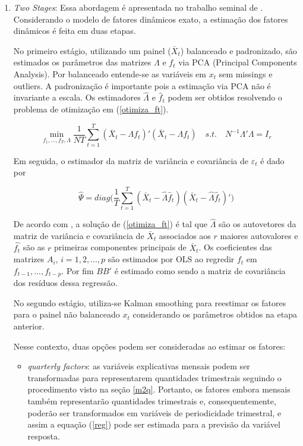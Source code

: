 \documentclass{article}
\begin{document}
\begin{enumerate}
\item \textit{Two Stages}: Essa abordagem é apresentada no trabalho seminal de \cite{giannoneetal2008}. Considerando o modelo de fatores dinâmicos exato, a estimação dos fatores dinâmicos é feita em duas etapas.

No primeiro estágio, utilizando um painel ($\bar{X}_t$) balanceado e padronizado, são estimados os parâmetros das matrizes $\Lambda$ e $f_t$ via PCA (Principal Components Analysis). Por balanceado entende-se as variáveis em $x_t$ sem missings e outliers. A padronização é importante pois a estimação via PCA não é invariante a escala. Os estimadores $\hat\Lambda$ e $\hat{f}_t$ podem ser obtidos resolvendo o problema de otimização em (\ref{otimiza_ft}).

\begin{equation}\label{otimiza_ft}
\min_{f_1,...,f_T,\Lambda} \frac{1}{NT} \sum_{t=1}^T (\bar{X}_t -\Lambda f_t)'(\bar{X}_t -\Lambda f_t) \quad s.t. \quad N^{-1} \Lambda'\Lambda = I_r
\end{equation}

Em seguida, o estimador da matriz de variância e covariância de $\varepsilon_t$ é dado por

\begin{equation}
\hat{\Psi} = diag\Bigg(\frac{1}{T} \sum_{t=1}^T (\bar{X}_t -\hat{\Lambda} \hat{f}_t)(\bar{X}_t -\hat{\Lambda} \hat{f}_t)'\Bigg)
\end{equation}

De acordo com \cite{stockwatson2011}, a solução de (\ref{otimiza_ft}) é tal que $\hat{\Lambda}$ são os autovetores da matriz de variância e covariância de $\bar{X}_t$ associados aos $r$ maiores autovalores e $\hat{f_t}$ são as $r$ primeiras componentes principais de $\bar{X}_t$. Os coeficientes das matrizes $A_i$, $i = 1,2,...,p$ são estimados por OLS ao regredir $f_t$ em $f_{t-1},...,f_{t-p}$. Por fim $BB'$ é estimado como sendo a matriz de covariância dos resíduos dessa regressão.

No segundo estágio, utiliza-se Kalman smoothing para reestimar os fatores para o painel não balanceado $x_t$ considerando os parâmetros obtidos na etapa anterior.

Nesse contexto, duas opções podem ser consideradas ao estimar os fatores:

\begin{itemize}
\item \textit{quarterly factors}: as variáveis explicativas mensais podem ser transformadas para representarem quantidades trimestrais seguindo o procedimento visto na seção \ref{m2q}. Portanto, os fatores embora mensais também representarão quantidades trimestrais e, consequentemente, poderão ser transformados em variáveis de periodicidade trimestral, e assim a equação (\ref{reg}) pode ser estimada para a previsão da variável resposta.


\end{itemize}
\end{enumerate}
\end{document}
